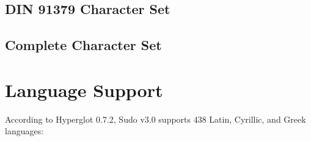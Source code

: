 \documentclass[paper=a4, 10pt]{scrbook}
\begin{document}
\section{DIN 91379 Character Set}


\section{Complete Character Set}



\chapter{Language Support}\label{languages}

According to Hyperglot 0.7.2, Sudo v3.0 supports 438 Latin, Cyrillic, and Greek languages:
\end{document}
